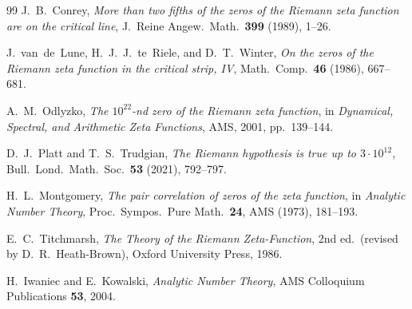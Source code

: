 \documentclass[12pt,a4paper]{article}
\theoremstyle{remark}
\begin{document}
\begin{thebibliography}{99}
J.~B.~Conrey,
\textit{More than two fifths of the zeros of the Riemann zeta function are on the critical line},
J.\ Reine Angew.\ Math.\ \textbf{399} (1989), 1--26.

J.~van~de~Lune, H.~J.~J.~te~Riele, and D.~T.~Winter,
\textit{On the zeros of the Riemann zeta function in the critical strip, IV},
Math.\ Comp.\ \textbf{46} (1986), 667--681.

A.~M.~Odlyzko,
\textit{The $10^{22}$-nd zero of the Riemann zeta function},
in \textit{Dynamical, Spectral, and Arithmetic Zeta Functions}, AMS, 2001, pp.\ 139--144.

D.~J.~Platt and T.~S.~Trudgian,
\textit{The Riemann hypothesis is true up to $3\cdot10^{12}$},
Bull.\ Lond.\ Math.\ Soc.\ \textbf{53} (2021), 792--797.

H.~L.~Montgomery,
\textit{The pair correlation of zeros of the zeta function},
in \textit{Analytic Number Theory}, Proc.\ Sympos.\ Pure Math.\ \textbf{24},
AMS (1973), 181--193.

E.~C.~Titchmarsh,
\textit{The Theory of the Riemann Zeta-Function}, 2nd ed.\ (revised by D.~R.~Heath-Brown),
Oxford University Press, 1986.

H.~Iwaniec and E.~Kowalski,
\textit{Analytic Number Theory},
AMS Colloquium Publications \textbf{53}, 2004.

\end{thebibliography}
\end{document}
